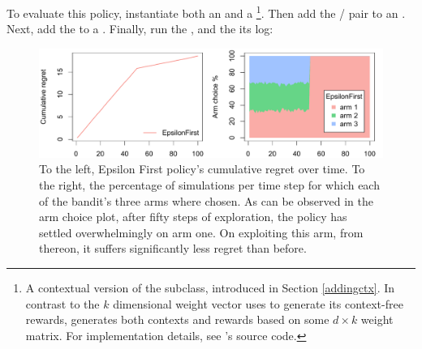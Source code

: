 \documentclass{jss}
\begin{document}
To evaluate this policy, instantiate both an  and a  \footnote{A contextual version of the  subclass, introduced in Section \ref{addingctx}. In contrast to the $k$ dimensional weight vector  uses to generate its context-free rewards,  generates both contexts and rewards based on some $d \times k$ weight matrix. For implementation details, see 's source code.}. Then add the / pair to an . Next, add the  to a . Finally, run the , and  the its  log:

\begin{figure}[H]
\centering
\includegraphics[width=.99\textwidth]{fig/section_5_2}
\caption{To the left, Epsilon First policy's cumulative regret over time. To the right, the percentage of simulations per time step for which each of the bandit's three arms where chosen. As can be observed in the arm choice plot, after fifty steps of exploration, the policy has settled overwhelmingly on arm one. On exploiting this arm, from thereon, it suffers significantly less regret than before.}
\label{fig:section_5_2}
\end{figure}
\end{document}
